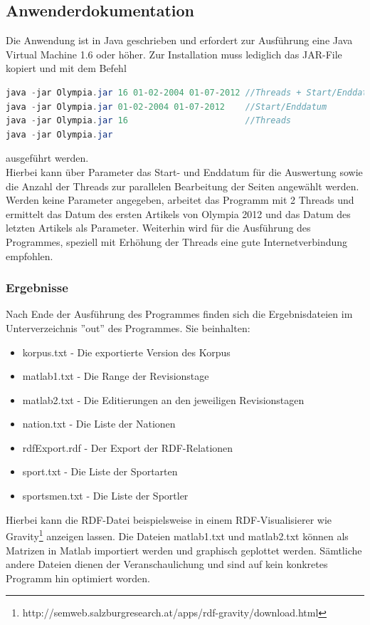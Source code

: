 \documentclass[pagesize=auto, titlepage=on]{scrartcl}
\begin{document}
\subsection{Anwenderdokumentation}
\label{sec:anwenderdokumentation}
Die Anwendung ist in Java geschrieben und erfordert zur Ausführung eine Java Virtual Machine 1.6 oder höher.
Zur Installation muss lediglich das JAR-File kopiert und mit dem Befehl
\begin{lstlisting}[language=Java]
java -jar Olympia.jar 16 01-02-2004 01-07-2012 //Threads + Start/Enddatum 
java -jar Olympia.jar 01-02-2004 01-07-2012    //Start/Enddatum 
java -jar Olympia.jar 16                       //Threads
java -jar Olympia.jar
\end{lstlisting}
ausgeführt werden.\\
Hierbei kann über Parameter das Start- und Enddatum für die Auswertung sowie die Anzahl der Threads zur parallelen Bearbeitung der Seiten angewählt werden. Werden keine Parameter angegeben, arbeitet das Programm mit 2 Threads und ermittelt das Datum des ersten Artikels von Olympia 2012 und das Datum des letzten Artikels als Parameter.  
Weiterhin wird für die Ausführung des Programmes, speziell mit Erhöhung der Threads eine gute Internetverbindung empfohlen.
\subsubsection{Ergebnisse}
Nach Ende der Ausführung des Programmes finden sich die Ergebnisdateien im Unterverzeichnis ''out'' des Programmes. Sie beinhalten:
\begin{itemize}
\item korpus.txt - Die exportierte Version des Korpus
\item matlab1.txt - Die Range der Revisionstage
\item matlab2.txt - Die Editierungen an den jeweiligen Revisionstagen
\item nation.txt - Die Liste der Nationen
\item rdfExport.rdf - Der Export der RDF-Relationen
\item sport.txt - Die Liste der Sportarten
\item sportsmen.txt - Die Liste der Sportler
\end{itemize}
Hierbei kann die RDF-Datei beispielsweise in einem RDF-Visualisierer wie Gravity\footnote{http://semweb.salzburgresearch.at/apps/rdf-gravity/download.html} anzeigen lassen. Die Dateien matlab1.txt und matlab2.txt können als Matrizen in Matlab importiert werden und graphisch geplottet werden. Sämtliche andere Dateien dienen der Veranschaulichung und sind auf kein konkretes Programm hin optimiert worden.
\end{document}
